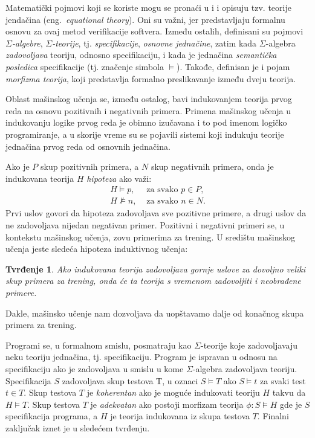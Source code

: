 \documentclass[a4paper]{article}
\newtheorem*{tvrdjenje}{Tvrđenje}
\theoremstyle{definition}
\begin{document}
{\par Matematički pojmovi koji se koriste mogu se pronaći u \cite{verify} i \cite{equationaltheory} i opisuju tzv. teorije jendačina (eng.~{\em equational theory}). Oni su važni, jer predstavljaju formalnu osnovu za ovaj metod verifikacije softvera. Između ostalih, definisani su pojmovi \emph{$\Sigma$-algebre}, \emph{$\Sigma$-teorije}, tj. \emph{specifikacije}, \emph{osnovne jednačine}, zatim kada $\Sigma$-algebra \emph{zadovoljava} teoriju, odnosno specifikaciju, i kada je jednačina \emph{semantička posledica} specifikacije (tj. značenje simbola $\models$). Takođe, definisan je i pojam \emph{morfizma teorija}, koji predstavlja formalno preslikavanje između dveju teorija.

\par Oblast mašinskog učenja se, između ostalog, bavi indukovanjem teorija prvog reda na osnovu pozitivnih i negativnih primera. Primena mašinskog učenja u indukovanju logike prvog reda je obimno izučavana i to pod imenom logičko programiranje, a u skorije vreme su se pojavili sistemi koji indukuju teorije jednačina prvog reda od osnovnih jednačina.

\par Ako je $P$ skup pozitivnih primera, a $N$ skup negativnih primera, onda je indukovana teorija $H$ \emph{hipoteza} ako važi:
\begin{eqnarray*}
H\models p, & \mbox{ za svako } p\in P,\\
H\not\models n, & \mbox{ za svako } n\in N.
\end{eqnarray*}
Prvi uslov govori da hipoteza zadovoljava sve pozitivne primere, a drugi uslov da ne zadovoljava nijedan negativan primer. Pozitivni i negativni primeri se, u kontekstu mašinskog učenja, zovu primerima za trening. U središtu mašinskog učenja jeste sledeća hipoteza induktivnog učenja:
\begin{tvrdjenje}
Ako indukovana teorija zadovoljava gornje uslove za dovoljno veliki skup primera za trening, onda će ta teorija s vremenom zadovoljiti i neobrađene primere.
\end{tvrdjenje}
Dakle, mašinsko učenje nam dozvoljava da uopštavamo dalje od ko\-na\-čnog skupa primera za trening.

\par Programi se, u formalnom smislu, posmatraju kao $\Sigma$-teorije koje zadovoljavaju neku teoriju jednačina, tj. specifikaciju. Program je ispravan u odnosu na specifikaciju ako je zadovoljava u smislu u kome $\Sigma$-algebra zadovoljava teoriju. Specifikacija $S$ zadovoljava skup testova T, u oznaci $S\models T$ ako $S\models t$ za svaki test $t\in T$. Skup testova $T$ je \emph{koherentan} ako je moguće indukovati teoriju $H$ takvu da $H\models T$. Skup testova $T$ je \emph{adekvatan} ako postoji morfizam teorija $\phi:S\models H$ gde je $S$ specifikacija programa, a $H$ je teorija indukovana iz skupa testova $T$. Finalni zaključak iznet je u sledećem tvrđenju.

}
\end{document}
